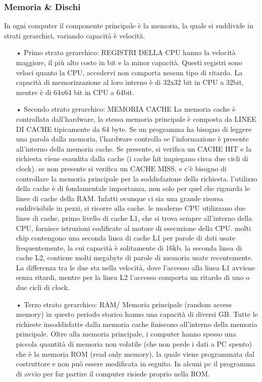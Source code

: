 \documentclass{article}
\begin{document}
\subsubsection{Memoria \& Dischi}
In ogni computer il componente principale è la memoria, la quale si suddivide in strati gerarchici, variando capacità è velocità.
\begin{enumerate}
   \item[•] Primo strato gerarchico: REGISTRI DELLA CPU 
hanno la velocità maggiore, il più alto costo in bit e la minor capacità. Questi registri sono veloci quanto la CPU, accedervi non comporta nessun tipo di ritardo. La capacità di memorizzazione al loro interno è di 32x32 bit in CPU a 32bit, mentre è di 64x64 bit in CPU a 64bit.
   \item[•] Secondo strato gerarchico: MEMORIA CACHE    
La memoria cache è controllata dall’hardware, la stessa memoria principale è composta da LINEE DI CACHE tipicamente da 64 byte. Se un programma ha bisogno di leggere una parola dalla memoria, l’hardware controlla se l’informazione è presente all’interno della memoria cache. Se presente, si verifica un CACHE HIT e la richiesta viene esaudita dalla cache (i cache hit impiegano circa due cicli di clock). se non presente si verifica un CACHE MISS, e c’è bisogno di controllare la memoria principale per la soddisfazione della richiesta.
l’utilizzo della cache è di fondamentale importanza, non solo per quel che riguarda le linee di cache della RAM. Infatti ovunque ci sia una grande risorsa suddivisibile in pezzi, si ricorre alla cache.
le moderne CPU utilizzano due linee di cache, primo livello di cache L1, che si trova sempre all’interno della CPU, fornisce istruzioni codificate al motore di esecuzione della CPU. molti chip contengono una seconda linea di cache L1 per parole di dati usate frequentemente, la cui capacità è solitamente di 16kb.
la seconda linea di cache L2, contiene molti megabyte di parole di memoria usate recentemente. La differenza tra le due sta nella velocità, dove l’accesso alla linea L1 avviene senza ritardi, mentre per la linea L2 l’accesso comporta un ritardo di uno o due cicli di clock.
   \item[•] Terzo strato gerarchico: RAM/ Memoria principale (random access memory)
in questo periodo storico hanno una capacità di diversi GB. Tutte le richieste insoddisfatte dalla memoria cache finiscono all’interno della memoria principale. Oltre alla memoria principale, i computer hanno spesso una piccola quantità di memoria non volatile (che non perde i dati a PC spento) che è la memoria ROM (read only memory), la quale viene programmata dal costruttore e non può essere modificata in seguito. In alcuni pc il programma di avvio per far partire il computer risiede proprio nella ROM.

\end{enumerate}
\end{document}
